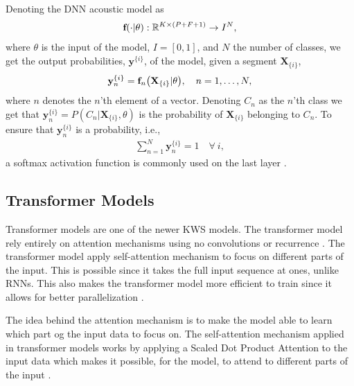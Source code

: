 Denoting the DNN acoustic model as 
\begin{align}
    \textbf{f}\qty(\cdot|\theta): \mathbb{R}^{K\times (P+F+1)} \rightarrow I^N, 
\end{align}
where \(\theta\) is the input of the model, \(I = [0,1]\), and \(N\) the number of classes, we get the output probabilities, \(\textbf{y}^{\{i\}}\), of the model, given a segment \(\textbf{X}_{\{i\}}\),
\begin{align}
    \textbf{y}_n^{\{i\}} = \textbf{f}_n\qty(\textbf{X}_{\{i\}}|\theta), \quad n = 1, \dots, N,
\end{align}
where \(n\) denotes the \(n\)'th element of a vector. Denoting \(C_n\) as the \(n\)'th class we get that \(\textbf{y}_n^{\{i\}} = P(C_n|\textbf{X}_{\{i\}}, \theta)\) is the probability of \(\textbf{X}_{\{i\}}\) belonging to \(C_n\). To ensure that \(\textbf{y}_n^{\{i\}}\) is a probability, i.e., 
\begin{align}
    \sum_{n=1}^N \textbf{y}_n^{\{i\}} = 1 \quad \forall \ i,
\end{align}
a softmax activation function \cite{rothman2020artificial} is commonly used on the last layer \cite{lopez2021deep}.


\subsection{Transformer Models}
Transformer models are one of the newer KWS models. The transformer model rely entirely on attention mechanisms using no convolutions or recurrence \cite{}. The transformer model apply self-attention mechanism to focus on different parts of the input. This is possible since it takes the full input sequence at ones, unlike RNNs. This also makes the transformer model more efficient to train since it allows for better parallelization \cite{}. 

The idea behind the attention mechanism is to make the model able to learn which part og the input data to focus on. The self-attention mechanism applied in transformer models works by applying a Scaled Dot Product Attention to the input data which makes it possible, for the model, to attend to different parts of the input \cite{}. 

